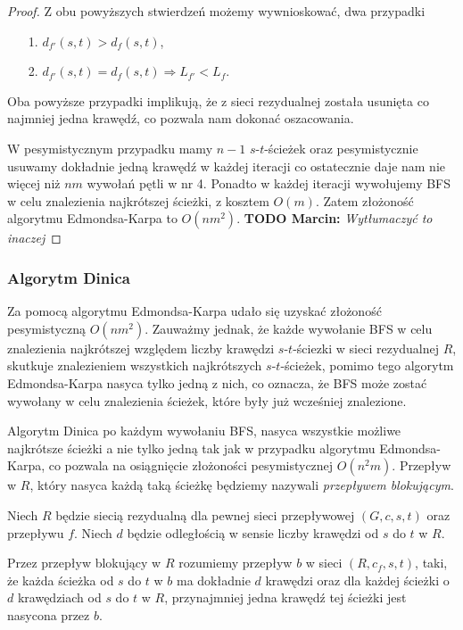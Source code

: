 \begin{theorem}
\begin{proof}
		Z obu powyższych stwierdzeń możemy wywnioskować, dwa przypadki
		\begin{itemize}
			\item[1.] $d_{f'}(s, t) > d_f(s, t)$,
			\item[2.] $d_{f'}(s, t) = d_f(s, t) \Rightarrow 
			L_{f'} < L_f$.
		\end{itemize}
		Oba powyższe przypadki implikują, że z sieci rezydualnej została 
		usunięta co najmniej jedna krawędź, co pozwala nam 
		dokonać oszacowania.
		
		W pesymistycznym przypadku mamy $n-1$ $s$-$t$-ścieżek oraz 
		pesymistycznie usuwamy dokładnie jedną krawędź w każdej iteracji
		co ostatecznie daje nam nie więcej niż $nm$ wywołań pętli w nr 4.
		Ponadto w każdej iteracji wywołujemy BFS w celu znalezienia najkrótszej
		ścieżki, z kosztem $O(m)$. Zatem złożoność algorytmu Edmondsa-Karpa
		to $O(nm^2)$. \textbf{TODO Marcin:} \textit{Wytłumaczyć to inaczej}
		
	\end{proof}
\end{theorem}

\subsubsection{Algorytm Dinica}
Za pomocą algorytmu Edmondsa-Karpa udało się uzyskać złożoność 
pesymistyczną $O(nm^2)$. Zauważmy jednak, że każde wywołanie 
BFS w celu znalezienia najkrótszej względem liczby krawędzi 
$s$-$t$-ściezki w sieci rezydualnej $R$, skutkuje znalezieniem 
wszystkich najkrótszych $s$-$t$-ścieżek, pomimo tego algorytm
Edmondsa-Karpa nasyca tylko jedną z nich, co oznacza, że
BFS może zostać wywołany w celu znalezienia ścieżek,
które były już wcześniej znalezione.

Algorytm Dinica po każdym wywołaniu BFS, nasyca wszystkie możliwe najkrótsze ścieżki a nie tylko jedną
tak jak w przypadku algorytmu Edmondsa-Karpa, co pozwala na 
osiągnięcie złożoności pesymistycznej $O(n^2m)$. Przepływ w $R$, który nasyca każdą taką ścieżkę
będziemy nazywali \textit{przepływem blokującym}.

\begin{defi}
	Niech $R$ będzie siecią rezydualną dla pewnej sieci przepływowej
	$(G, c, s, t)$ oraz przepływu $f$. Niech $d$ będzie odległością w sensie
	liczby krawędzi od $s$ do $t$ w $R$.
	
	Przez przepływ blokujący w $R$ rozumiemy przepływ $b$ w sieci
	$(R, c_f, s, t)$, taki, że każda ścieżka od $s$ do $t$ 
	w $b$ ma dokładnie $d$ krawędzi oraz dla każdej ścieżki o $d$ 
	krawędziach od $s$ do $t$ w $R$, przynajmniej jedna krawędź tej ścieżki
	jest nasycona przez $b$.
\end{defi}

